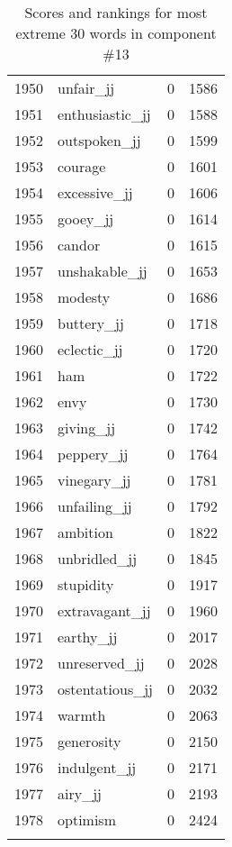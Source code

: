 \begin{longtable}[!htbp]{| rlr@{.}l |}
    1950 & unfair\_jj & 0 & 1586 \\
    1951 & enthusiastic\_jj & 0 & 1588 \\
    1952 & outspoken\_jj & 0 & 1599 \\
    1953 & courage & 0 & 1601 \\
    1954 & excessive\_jj & 0 & 1606 \\
    1955 & gooey\_jj & 0 & 1614 \\
    1956 & candor & 0 & 1615 \\
    1957 & unshakable\_jj & 0 & 1653 \\
    1958 & modesty & 0 & 1686 \\
    1959 & buttery\_jj & 0 & 1718 \\
    1960 & eclectic\_jj & 0 & 1720 \\
    1961 & ham & 0 & 1722 \\
    1962 & envy & 0 & 1730 \\
    1963 & giving\_jj & 0 & 1742 \\
    1964 & peppery\_jj & 0 & 1764 \\
    1965 & vinegary\_jj & 0 & 1781 \\
    1966 & unfailing\_jj & 0 & 1792 \\
    1967 & ambition & 0 & 1822 \\
    1968 & unbridled\_jj & 0 & 1845 \\
    1969 & stupidity & 0 & 1917 \\
    1970 & extravagant\_jj & 0 & 1960 \\
    1971 & earthy\_jj & 0 & 2017 \\
    1972 & unreserved\_jj & 0 & 2028 \\
    1973 & ostentatious\_jj & 0 & 2032 \\
    1974 & warmth & 0 & 2063 \\
    1975 & generosity & 0 & 2150 \\
    1976 & indulgent\_jj & 0 & 2171 \\
    1977 & airy\_jj & 0 & 2193 \\
    1978 & optimism & 0 & 2424 \\
    \hline
    \caption{Scores and rankings for most extreme 30 words in component \#13} \\
\end{longtable}
